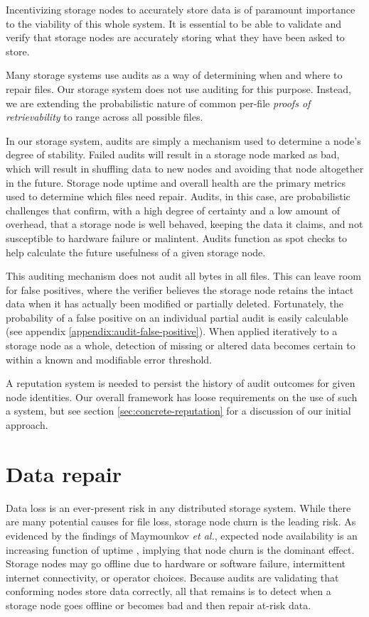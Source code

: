\documentclass[11pt,fleqn,openany]{book}
\begin{document}
Incentivizing storage nodes to accurately store data is of paramount importance
to
the viability of this whole system. It is essential to be able to
validate and verify that storage nodes are accurately storing what they have
been
asked to store.

Many storage systems use audits as a way of determining when and where to repair
files. Our storage system does not use auditing for this purpose.
Instead, we are extending the probabilistic nature of
common per-file {\em proofs of retrievability} \cite{proof-of-retrievability}
to range across all possible files.

In our storage system,
audits are simply a mechanism used to determine a node's degree of stability.
Failed audits will result in a storage node marked as bad, which
will result in shuffling data to new nodes and avoiding that node altogether
in the future. Storage node uptime and overall health are the primary metrics
used to determine which files need repair.
Audits, in this case, are probabilistic challenges that confirm, with a high
degree of certainty and a low amount of overhead, that a storage node is well
behaved, keeping the data it claims, and not susceptible to hardware
failure or malintent. Audits function as spot checks to help calculate
the future usefulness of a given storage node.

This auditing mechanism does not audit all bytes in all files. This can
leave room for false positives, where the verifier believes the storage node
retains the intact data when it has actually been modified or partially
deleted. Fortunately, the probability of a false positive on an individual
partial audit is easily calculable (see appendix
\ref{appendix:audit-false-positive}). When applied
iteratively to a storage node as a whole, detection of missing or altered data
becomes certain to within a known and modifiable error threshold.

A reputation system is needed to persist the history of audit outcomes for
given node identities. Our overall framework has loose requirements on the use
of such a system, but see section \ref{sec:concrete-reputation} for a
discussion of our initial approach.

\section{Data repair}

Data loss is an ever-present risk in any distributed storage system. While there
are many potential causes for file loss, storage node churn is the leading
risk. As evidenced by the findings of Maymounkov {\em et al.}, expected node
availability is an increasing function of uptime \cite{kad}, implying that node
churn is the dominant effect. Storage nodes
may go offline due to hardware or software failure, intermittent internet
connectivity, or operator choices.
Because audits are validating that conforming nodes store data correctly, all
that remains is to detect when a storage node goes offline or becomes bad and
then repair at-risk data.
\end{document}
